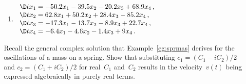 \begin{exercise}
\begin{enumerate}
\item \(\begin{array}{l}
\D t{x_1}= -50.2x_1 -39.5x_2 -20.2x_3 +68.9x_4\,,\\
\D t{x_2}= 62.8x_1 +50.2x_2 +28.4x_3 -85.2x_4\,,\\
\D t{x_3}= -17.3x_1 -13.7x_2 -8.9x_3 +22.7x_4\,,\\
\D t{x_4}= -6.4x_1 -4.6x_2 -1.4x_3 +9x_4\,.
\end{array}\)
\setbox\ajrqrbox\hbox{}\marginpar{\usebox{\ajrqrbox}}%

\end{enumerate}
\end{exercise}





\begin{exercise} \label{ex:sprmas} 
Recall the general complex solution that Example~\ref{eg:sprmas} derives for the oscillations of a mass on a spring.
Show that substituting \(c_1=(C_1-iC_2)/2\) and \(c_2=(C_1+iC_2)/2\) for real~\(C_1\) and~\(C_2\) results in the velocity~\(v(t)\) being expressed algebraically in purely real terms.
\end{exercise}






\begin{comment}%
why, what caused X?
how did X occur?
what-if? what-if-not?
how does X compare with Y?
what is the evidence for X?
why is X important?
\end{comment}




